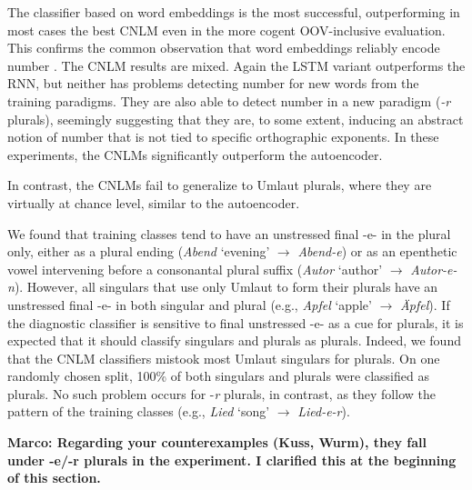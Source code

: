 The classifier based on word embeddings is the most successful,
outperforming in most cases the best CNLM even in the more cogent
OOV-inclusive evaluation. This confirms the common observation that
word embeddings reliably encode number \cite{Mikolov:etal:2013a}. The
CNLM results are mixed. Again the LSTM variant outperforms the
RNN, but neither has problems detecting number for new words from
the training paradigms. They are also able to detect number in a new
paradigm (\emph{-r} plurals), seemingly suggesting that they are, to some extent,
inducing an abstract notion of number that is not tied to specific
orthographic exponents. In these experiments, the CNLMs significantly
outperform the autoencoder. %

In contrast, the CNLMs fail to generalize to Umlaut plurals, where
they are virtually at chance level, similar to the autoencoder. %

We found that training classes tend to have an unstressed final -e- in
the plural only, either as a plural ending (\emph{Abend} `evening' $\rightarrow$ \emph{Abend-e}) or as an epenthetic vowel
intervening before a consonantal plural suffix (\emph{Autor} `author' $\rightarrow$ \emph{Autor-e-n}).
However, all singulars
that use only Umlaut to form their plurals have an unstressed final -e-
in both singular and plural (e.g., \emph{Apfel} `apple' $\rightarrow$ \emph{{\"A}pfel}). 
If the diagnostic classifier is sensitive to final unstressed -e- as a cue for plurals,
it is expected that
it should classify singulars and plurals as plurals.
Indeed, we found that the CNLM classifiers mistook
most Umlaut singulars for plurals.  On one randomly chosen split,
100\% of both singulars and plurals were classified as plurals.  
No such problem occurs for -\emph{r} plurals, in contrast, as they
follow the pattern of the training classes (e.g., \emph{Lied} `song' $\rightarrow$ \emph{Lied-e-r}).

\textbf{Marco: Regarding your counterexamples (Kuss, Wurm), they fall under -e/-r plurals in the experiment. I clarified this at the beginning of this section.}

